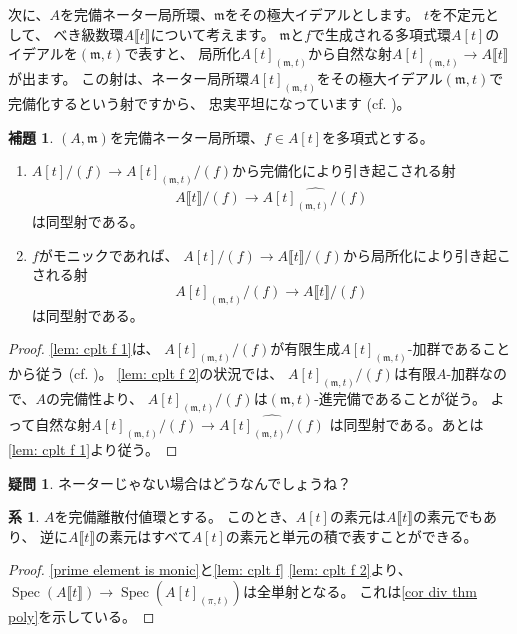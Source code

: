 \documentclass[uplatex]{jsarticle}
\theoremstyle{definition}
\newtheorem{cor}[cor]{系}
\newtheorem{lem}[lem]{補題}
\newtheorem*{question*}{疑問}
\DeclareMathOperator{\Spec}{\mathrm{Spec}}
\newcommand{\lb}[1]{\llbracket #1\rrbracket}
\newcommand{\mfm}{\mathfrak{m}}
\begin{document}
次に、\(A\)を完備ネーター局所環、\(\mfm\)をその極大イデアルとします。
\(t\)を不定元として、
べき級数環\(A\lb{t}\)について考えます。
\(\mfm\)と\(f\)で生成される多項式環\(A[t]\)のイデアルを\((\mfm,t)\)で表すと、
局所化\(A[t]_{(\mfm,t)}\)から自然な射\(A[t]_{(\mfm,t)}\to A\lb{t}\)が出ます。
この射は、ネーター局所環\(A[t]_{(\mfm,t)}\)をその極大イデアル\((\mfm,t)\)で完備化するという射ですから、
忠実平坦になっています (cf. \cite[命題10.14, 演習問題3.16, 演習問題3.18]{AM})。


\begin{lem}\label{lem: cplt f}
  \((A,\mfm)\)を完備ネーター局所環、\(f\in A[t]\)を多項式とする。
  \begin{enumerate}
    \item \label{lem: cplt f 1}
    \(A[t]/(f) \to A[t]_{(\mfm,t)}/(f)\)から完備化により引き起こされる射
    \[
    A\lb{t}/(f)\to \hat{A[t]_{(\mfm,t)}/(f)}
    \]
    は同型射である。
    \item \label{lem: cplt f 2}
    \(f\)がモニックであれば、
    \(A[t]/(f)\to A\lb{t}/(f)\)から局所化により引き起こされる射
    \[
    A[t]_{(\mfm,t)}/(f) \to A\lb{t}/(f)
    \]
    は同型射である。
  \end{enumerate}
\end{lem}

\begin{proof}
  \ref{lem: cplt f 1}は、
  \(A[t]_{(\mfm,t)}/(f)\)が有限生成\(A[t]_{(\mfm,t)}\)-加群であることから従う
  (cf. \cite[命題10.13]{AM})。
  \ref{lem: cplt f 2}の状況では、
  \(A[t]_{(\mfm,t)}/(f)\)は有限\(A\)-加群なので、\(A\)の完備性より、
  \(A[t]_{(\mfm,t)}/(f)\)は\((\mfm,t)\)-進完備であることが従う。
  よって自然な射\(A[t]_{(\mfm,t)}/(f) \to \hat{A[t]_{(\mfm,t)}/(f)}\)
  は同型射である。あとは\ref{lem: cplt f 1}より従う。
\end{proof}


\begin{question*}
  ネーターじゃない場合はどうなんでしょうね？
\end{question*}



\begin{cor}\label{cor div thm poly}
  \(A\)を完備離散付値環とする。
  このとき、\(A[t]\)の素元は\(A\lb{t}\)の素元でもあり、
  逆に\(A\lb{t}\)の素元はすべて\(A[t]\)の素元と単元の積で表すことができる。
\end{cor}

\begin{proof}
  \autoref{prime element is monic}と\autoref{lem: cplt f} \ref{lem: cplt f 2}より、
  \(\Spec(A\lb{t}) \to \Spec(A[t]_{(\pi,t)})\)は全単射となる。
  これは\autoref{cor div thm poly}を示している。
\end{proof}
\end{document}

